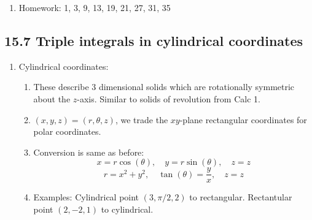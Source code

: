 \documentclass{article}
\begin{document}
\begin{enumerate}
\item Homework: 1, 3, 9, 13, 19, 21, 27, 31, 35 

\end{enumerate}


\subsection{15.7 Triple integrals in cylindrical coordinates}
\begin{enumerate}

\item Cylindrical coordinates:
\begin{enumerate}
\item These describe 3 dimensional solids which are rotationally symmetric about the $z$-axis. Similar to solids of revolution from Calc 1.
\item $(x,y,z)=(r,\theta,z)$, we trade the $xy$-plane rectangular coordinates for polar coordinates.
\item Conversion is same as before:
\[
x=r\cos(\theta), \quad y = r\sin(\theta), \quad z=z
\]
\[
r=x^2+y^2, \quad \tan(\theta) = \frac{y}{x}, \quad z=z
\]
\item Examples: Cylindrical point $(3,\pi/2, 2)$ to rectangular. Rectantular point $(2,-2, 1)$ to cylindrical.
\end{enumerate}


\end{enumerate}
\end{document}
